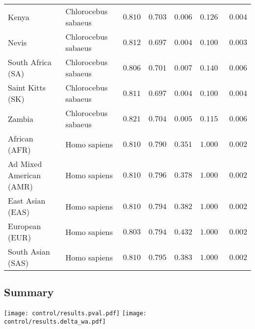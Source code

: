 \begin{center}
\begin{adjustbox}{width = 1\textwidth}
\begin{tabular}{|l|l|r|r|r|r|r|}
            Kenya              & Chlorocebus sabaeus & $ 0.810$ & $ 0.703$ & $ 0.006$ & $ 0.126~~$     & $ 0.004$ \\
            Nevis               & Chlorocebus sabaeus & $ 0.812$ & $ 0.697$ & $ 0.004$ & $ 0.100~~$     & $ 0.003$ \\
            South Africa (SA)                         & Chlorocebus sabaeus & $ 0.806$ & $ 0.701$ & $ 0.007$ & $ 0.140~~$     & $ 0.006$ \\
            Saint Kitts (SK)                  & Chlorocebus sabaeus        & $ 0.811$ & $ 0.697$ & $ 0.004$ & $ 0.100~~$     & $ 0.004$ \\
            Zambia        & Chlorocebus sabaeus        & $ 0.821$ & $ 0.704$ & $ 0.005$ & $ 0.115~~$     & $ 0.006$ \\
            African (AFR)               & Homo sapiens        & $ 0.810$ & $ 0.790$ & $ 0.351$ & $ 1.000~~$     & $ 0.002$ \\
            Ad Mixed American (AMR)                 & Homo sapiens        & $ 0.810$ & $ 0.796$ & $ 0.378$ & $ 1.000~~$     & $ 0.002$ \\
            East Asian (EAS)              & Homo sapiens        & $ 0.810$ & $ 0.794$ & $ 0.382$ & $ 1.000~~$     & $ 0.002$ \\
            European (EUR)              & Homo sapiens        & $ 0.803$ & $ 0.794$ & $ 0.432$ & $ 1.000~~$     & $ 0.002$ \\
            South Asian (SAS)              & Homo sapiens        & $ 0.810$ & $ 0.795$ & $ 0.383$ & $ 1.000~~$     & $ 0.002$ \\
            \bottomrule
        \end{tabular}
    \end{adjustbox}
    \newpage
\end{center}

\subsection{Summary}
\begin{center}
    \texttt{[image: control/results.pval.pdf]}
    \texttt{[image: control/results.delta\_wa.pdf]}
\end{center}